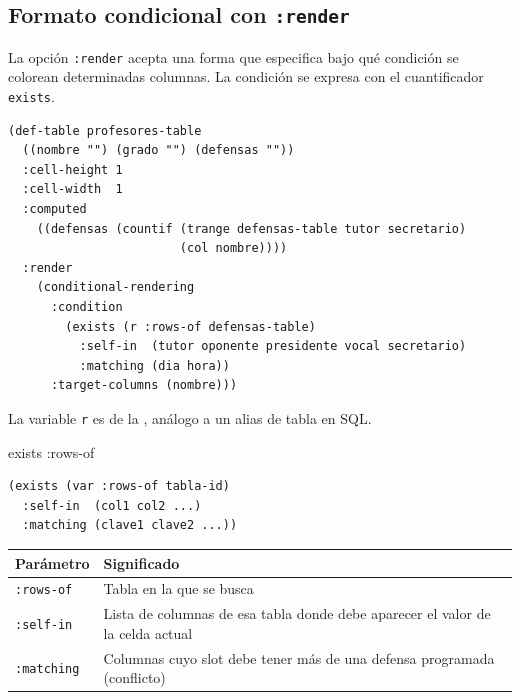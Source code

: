 \documentclass[12pt,a4paper]{report}
\begin{document}

\subsection{Formato condicional con \texttt{:render}}

La opción \texttt{:render} acepta una forma 
que especifica bajo qué condición se colorean determinadas columnas.
La condición se expresa con el cuantificador \texttt{exists}.


\begin{lstlisting}[caption={Formato condicional sobre profesores-table.}]
(def-table profesores-table
  ((nombre "") (grado "") (defensas ""))
  :cell-height 1
  :cell-width  1
  :computed
    ((defensas (countif (trange defensas-table tutor secretario)
                        (col nombre))))
  :render
    (conditional-rendering
      :condition
        (exists (r :rows-of defensas-table)
          :self-in  (tutor oponente presidente vocal secretario)
          :matching (dia hora))
      :target-columns (nombre)))
\end{lstlisting}

La variable \texttt{r} es  de la ,
análogo a un alias de tabla en SQL.


\begin{sintaxisbox}{exists :rows-of}
\begin{lstlisting}
(exists (var :rows-of tabla-id)
  :self-in  (col1 col2 ...)
  :matching (clave1 clave2 ...))
\end{lstlisting}
\end{sintaxisbox}

\begin{center}
\renewcommand{\arraystretch}{1.3}
\begin{tabular}{>{\ttfamily}p{3.5cm}p{8.5cm}}
\toprule
\textbf{Parámetro} & \textbf{Significado} \\
\midrule
\texttt{:rows-of} & Tabla en la que se busca \\
\texttt{:self-in} & Lista de columnas de esa tabla donde debe aparecer
                    el valor de la celda actual \\
\texttt{:matching} & Columnas cuyo slot debe tener más de una defensa
                     programada (conflicto) \\
\bottomrule
\end{tabular}
\end{center}
\end{document}
